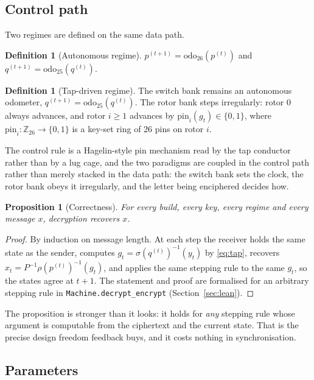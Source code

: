\documentclass[11pt]{article}
\newtheorem{proposition}[theorem]{Proposition}
\theoremstyle{definition}
\newtheorem{definition}[theorem]{Definition}
\newcommand{\ZZ}{\mathbb{Z}}
\newcommand{\lean}[1]{{\small\texttt{#1}}}
\begin{document}
\subsection{Control path}

Two regimes are defined on the same data path.

\begin{definition}[Autonomous regime]
$p^{(t+1)} = \mathrm{odo}_{26}(p^{(t)})$ and $q^{(t+1)} = \mathrm{odo}_{25}(q^{(t)})$.
\end{definition}

\begin{definition}[Tap-driven regime]\label{def:closed}
The switch bank remains an autonomous odometer, $q^{(t+1)} =
\mathrm{odo}_{25}(q^{(t)})$. The rotor bank steps irregularly: rotor $0$ always
advances, and rotor $i \ge 1$ advances by $\mathrm{pin}_i(g_t) \in \{0,1\}$,
where $\mathrm{pin}_i : \ZZ_{26} \to \{0,1\}$ is a key-set ring of $26$ pins on
rotor $i$.
\end{definition}

The control rule is a Hagelin-style pin mechanism read by the tap conductor
rather than by a lug cage, and the two paradigms are coupled in the control path
rather than merely stacked in the data path: the switch bank sets the clock, the
rotor bank obeys it irregularly, and the letter being enciphered decides how.

\begin{proposition}[Correctness]\label{prop:correct}
For every build, every key, every regime and every message $x$, decryption
recovers $x$.
\end{proposition}

\begin{proof}
By induction on message length. At each step the receiver holds the same state
as the sender, computes $g_t = \sigma(q^{(t)})^{-1}(y_t)$ by
\eqref{eq:tap}, recovers $x_t = P^{-1}\rho(p^{(t)})^{-1}(g_t)$, and applies the
same stepping rule to the same $g_t$, so the states agree at $t+1$. The
statement and proof are formalised for an arbitrary stepping rule in
\lean{Machine.decrypt\_encrypt} (Section~\ref{sec:lean}).
\end{proof}

The proposition is stronger than it looks: it holds for \emph{any} stepping rule
whose argument is computable from the ciphertext and the current state. That is
the precise design freedom feedback buys, and it costs nothing in
synchronisation.

\subsection{Parameters}
\end{document}
